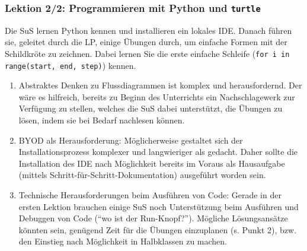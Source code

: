 \begin{myExBox}[title=DL \themycounter]
\subsubsection*{Lektion 2/2: Programmieren mit Python und \lstinline|turtle|}
Die SuS lernen Python kennen und installieren ein lokales IDE. Danach führen sie, geleitet durch die LP, einige Übungen durch, um einfache Formen mit der Schildkröte zu zeichnen. Dabei lernen Sie die erste einfache Schleife (\lstinline|for i in range(start, end, step)|) kennen.

\begin{myExBox}[title=Mögliche Schwierigkeiten \& geeignete Massnahmen]
\begin{enumerate}
    \item Abstraktes Denken zu Flussdiagrammen ist komplex und herausfordernd. Der wäre es hilfreich, bereits zu Beginn des Unterrichts ein Nachschlagewerk zur Verfügung zu stellen, welches die SuS dabei unterstützt, die Übungen zu lösen, indem sie bei Bedarf nachlesen können.
    \item BYOD als Herausforderung: Möglicherweise gestaltet sich der Installationsprozess komplexer und langwieriger als gedacht. Daher sollte die Installation des IDE nach Möglichkeit bereits im Voraus als Hausaufgabe (mittels Schritt-für-Schritt-Dokumentation) ausgeführt worden sein.
    \item Technische Herausforderungen beim Ausführen von Code: Gerade in der ersten Lektion brauchen einige SuS noch Unterstützung beim Ausführen und Debuggen von Code (``wo ist der Run-Knopf?''). Mögliche Lösungsansätze könnten sein, genügend Zeit für die Übungen einzuplanen (s. Punkt 2), bzw. den Einstieg nach Möglichkeit in Halbklassen zu machen. 
\end{enumerate}
\end{myExBox}
\end{myExBox}
\newpage{}

